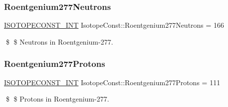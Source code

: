 \subsubsection{\texorpdfstring{Roentgenium277\+Neutrons}{Roentgenium277Neutrons}}
{\footnotesize\ttfamily \mbox{\hyperlink{group___isotope_const-_macros_ga5f18360b3e99483a35c32d789e62621c}{I\+S\+O\+T\+O\+P\+E\+C\+O\+N\+S\+T\+\_\+\+I\+NT}} Isotope\+Const\+::\+Roentgenium277\+Neutrons = 166}

\$ \$ Neutrons in Roentgenium-\/277. \mbox{\label{group___isotope_const-_roentgenium-_rg277_ga45870d068fcf4763cb69db182efcce40}} 
\subsubsection{\texorpdfstring{Roentgenium277\+Protons}{Roentgenium277Protons}}
{\footnotesize\ttfamily \mbox{\hyperlink{group___isotope_const-_macros_ga5f18360b3e99483a35c32d789e62621c}{I\+S\+O\+T\+O\+P\+E\+C\+O\+N\+S\+T\+\_\+\+I\+NT}} Isotope\+Const\+::\+Roentgenium277\+Protons = 111}

\$ \$ Protons in Roentgenium-\/277. 